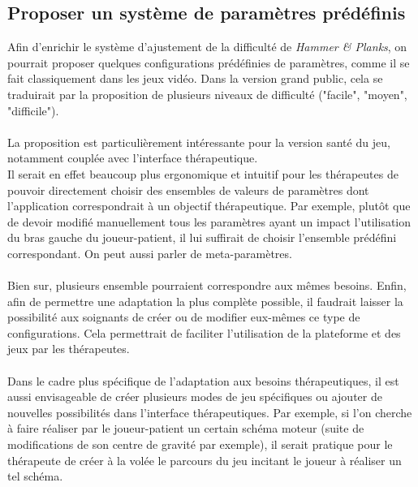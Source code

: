 	\subsection{Proposer un système de paramètres prédéfinis}
Afin d'enrichir le système d'ajustement de la difficulté de \emph{Hammer \& Planks}, on pourrait proposer quelques configurations prédéfinies de paramètres, comme il se fait classiquement dans les jeux vidéo. Dans la version grand public, cela se traduirait par la proposition de plusieurs niveaux de difficulté ("facile", "moyen", "difficile").

\paragraph{}
La proposition est particulièrement intéressante pour la version santé du jeu, notamment couplée avec l'interface thérapeutique. \\
Il serait en effet beaucoup plus ergonomique et intuitif pour les thérapeutes de pouvoir directement choisir des ensembles de valeurs de paramètres dont l'application correspondrait à un objectif thérapeutique. Par exemple, plutôt que de devoir modifié manuellement tous les paramètres ayant un impact l'utilisation du bras gauche du joueur-patient, il lui suffirait de choisir l'ensemble prédéfini correspondant. On peut aussi parler de meta-paramètres.

\paragraph{} Bien sur, plusieurs ensemble pourraient correspondre aux mêmes besoins. Enfin, afin de permettre une adaptation la plus complète possible, il faudrait laisser la possibilité aux soignants de créer ou de modifier eux-mêmes ce type de configurations. Cela permettrait de faciliter l'utilisation de la plateforme et des jeux par les thérapeutes.

\paragraph{} Dans le cadre plus spécifique de l'adaptation aux besoins thérapeutiques, il est aussi envisageable de créer plusieurs modes de jeu spécifiques ou ajouter de nouvelles possibilités dans l'interface thérapeutiques. Par exemple, si l'on cherche à faire réaliser par le joueur-patient un certain schéma moteur (suite de modifications de son centre de gravité par exemple), il serait pratique pour le thérapeute de créer à la volée le parcours du jeu incitant le joueur à réaliser un tel schéma.


